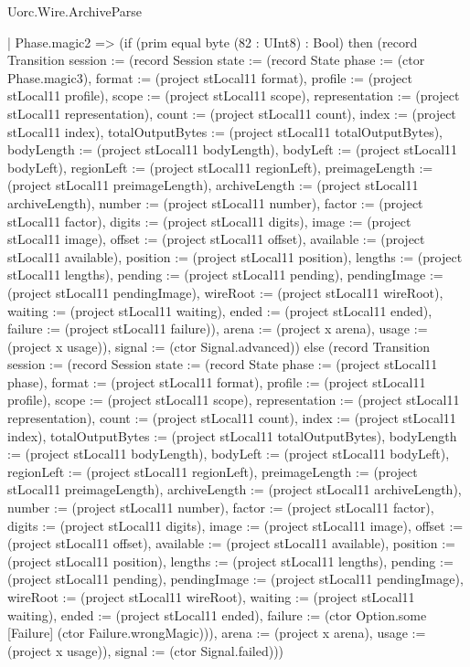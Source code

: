 \begin{lexlean}{Uorc.Wire.ArchiveParse}
\begin{semanticmodule}
{    | Phase.magic2 => (if (prim equal byte (82 : UInt8) : Bool) then (record Transition {session := (record Session {state := (record State {phase := (ctor Phase.magic3), format := (project stLocal11 format), profile := (project stLocal11 profile), scope := (project stLocal11 scope), representation := (project stLocal11 representation), count := (project stLocal11 count), index := (project stLocal11 index), totalOutputBytes := (project stLocal11 totalOutputBytes), bodyLength := (project stLocal11 bodyLength), bodyLeft := (project stLocal11 bodyLeft), regionLeft := (project stLocal11 regionLeft), preimageLength := (project stLocal11 preimageLength), archiveLength := (project stLocal11 archiveLength), number := (project stLocal11 number), factor := (project stLocal11 factor), digits := (project stLocal11 digits), image := (project stLocal11 image), offset := (project stLocal11 offset), available := (project stLocal11 available), position := (project stLocal11 position), lengths := (project stLocal11 lengths), pending := (project stLocal11 pending), pendingImage := (project stLocal11 pendingImage), wireRoot := (project stLocal11 wireRoot), waiting := (project stLocal11 waiting), ended := (project stLocal11 ended), failure := (project stLocal11 failure)}), arena := (project x arena), usage := (project x usage)}), signal := (ctor Signal.advanced)}) else (record Transition {session := (record Session {state := (record State {phase := (project stLocal11 phase), format := (project stLocal11 format), profile := (project stLocal11 profile), scope := (project stLocal11 scope), representation := (project stLocal11 representation), count := (project stLocal11 count), index := (project stLocal11 index), totalOutputBytes := (project stLocal11 totalOutputBytes), bodyLength := (project stLocal11 bodyLength), bodyLeft := (project stLocal11 bodyLeft), regionLeft := (project stLocal11 regionLeft), preimageLength := (project stLocal11 preimageLength), archiveLength := (project stLocal11 archiveLength), number := (project stLocal11 number), factor := (project stLocal11 factor), digits := (project stLocal11 digits), image := (project stLocal11 image), offset := (project stLocal11 offset), available := (project stLocal11 available), position := (project stLocal11 position), lengths := (project stLocal11 lengths), pending := (project stLocal11 pending), pendingImage := (project stLocal11 pendingImage), wireRoot := (project stLocal11 wireRoot), waiting := (project stLocal11 waiting), ended := (project stLocal11 ended), failure := (ctor Option.some [Failure] (ctor Failure.wrongMagic))}), arena := (project x arena), usage := (project x usage)}), signal := (ctor Signal.failed)}))
}
\end{semanticmodule}
\end{lexlean}
